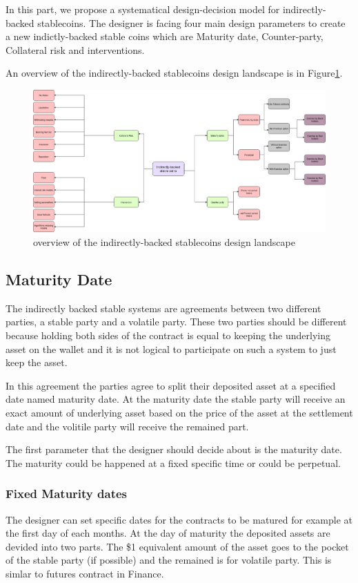 \documentclass[runningheads]{llncs}
\begin{document}
In this part, we propose a systematical design-decision model for indirectly-backed stablecoins. The designer is facing four main design parameters to create a new indictly-backed stable coins which are Maturity date, Counter-party, Collateral risk and interventions. 



An overview of the indirectly-backed stablecoins design landscape is in Figure\ref{land}.

\begin{figure} 
\centering
\includegraphics[width=12cm]{Mindmap}
\caption{overview of the indirectly-backed stablecoins design landscape}
\label{land}
\end{figure}

\subsection{Maturity Date}
The indirectly backed stable systems are agreements between two different parties, a stable party and a volatile party. These two parties should be different because holding both sides of the contract is equal to keeping the underlying asset on the wallet and it is not logical to participate on such a system to just keep the asset.

In this agreement the parties agree to split their deposited asset at a specified date named maturity date. At the maturity date the stable party will receive an exact amount of underlying asset based on the price of the asset at the settlement date and the volitile party will receive the remained part.

The first parameter that the designer should decide about is the maturity date. The maturity could be happened at a fixed specific time or could be perpetual.
\subsubsection{Fixed Maturity dates}
The designer can set specific dates for the contracts to be matured for example at the first day of each months. At the day of maturity the deposited assets are devided into two parts. The \$1 equivalent amount of the asset goes to the pocket of the stable party (if possible) and the remained is for volatile party. This is simlar to futures contract in Finance.
\end{document}
